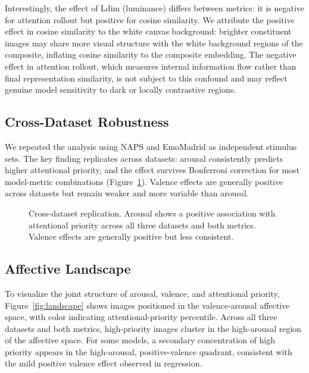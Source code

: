 \documentclass[12pt]{article}
\begin{document}
Interestingly, the effect of Ldim (luminance) differs between metrics: it is negative for attention rollout but positive for cosine similarity. We attribute the positive effect in cosine similarity to the white canvas background: brighter constituent images may share more visual structure with the white background regions of the composite, inflating cosine similarity to the composite embedding. The negative effect in attention rollout, which measures internal information flow rather than final representation similarity, is not subject to this confound and may reflect genuine model sensitivity to dark or locally contrastive regions.

\subsection{Cross-Dataset Robustness}

We repeated the analysis using NAPS and EmoMadrid as independent stimulus sets. The key finding replicates across datasets: arousal consistently predicts higher attentional priority, and the effect survives Bonferroni correction for most model-metric combinations (Figure~\ref{fig:cross_dataset}). Valence effects are generally positive across datasets but remain weaker and more variable than arousal.

\begin{figure}[h]
\centering
{}
\caption{Cross-dataset replication. Arousal shows a positive association with attentional priority across all three datasets and both metrics. Valence effects are generally positive but less consistent.}
\label{fig:cross_dataset}
\end{figure}

\subsection{Affective Landscape}

To visualize the joint structure of arousal, valence, and attentional priority, Figure~\ref{fig:landscape} shows images positioned in the valence-arousal affective space, with color indicating attentional-priority percentile. Across all three datasets and both metrics, high-priority images cluster in the high-arousal region of the affective space. For some models, a secondary concentration of high priority appears in the high-arousal, positive-valence quadrant, consistent with the mild positive valence effect observed in regression.
\end{document}
